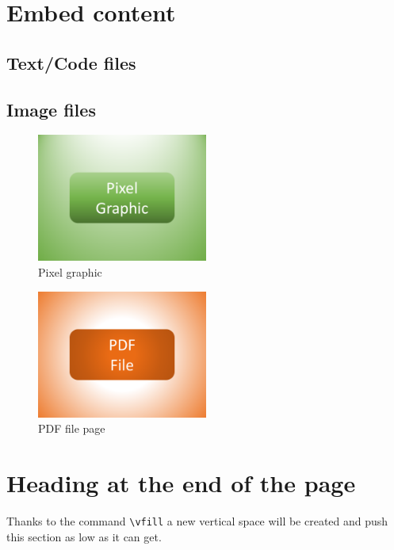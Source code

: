 \documentclass{article}				%
\begin{document}
\section{Embed content}

\subsection{Text/Code files}

\subsection{Image files}

\begin{figure}[ht]
	\centering
	\includegraphics[width=0.5\textwidth]{example-resource-pixel-graphic.png}
	\caption{Pixel graphic}
	\label{fig:pixelGraphic}
\end{figure}

\begin{figure}[ht]
	\centering
	\includegraphics[width=0.5\textwidth]{example-resource-pdf-file.pdf}
	\caption{PDF file page}
	\label{fig:pdfFile}
\end{figure}

\vfill

\section{Heading at the end of the page}

Thanks to the command \verb|\vfill| a new vertical space will be created and push this section as low as it can get.
\end{document}
